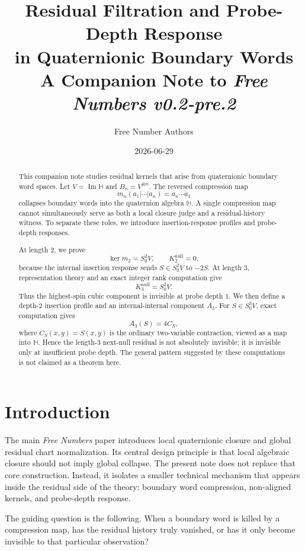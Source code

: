 \documentclass[11pt]{article}
\title{Residual Filtration and Probe-Depth Response\\
\large in Quaternionic Boundary Words\\[0.5em]
\normalsize A Companion Note to \emph{Free Numbers v0.2-pre.2}}
\author{Free Number Authors}
\date{2026-06-29}
\theoremstyle{definition}
\newcommand{\Ker}{\operatorname{ker}}
\begin{document}
\maketitle

\begin{abstract}
This companion note studies residual kernels that arise from quaternionic boundary word spaces.
Let $V=\operatorname{Im}\mathbb{H}$ and $B_n=V^{\otimes n}$.
The reversed compression map
\[
  m_n(a_1|\cdots|a_n)=a_n\cdots a_1
\]
collapses boundary words into the quaternion algebra $\mathbb{H}$.
A single compression map cannot simultaneously serve as both a local closure judge and a residual-history witness.
To separate these roles, we introduce insertion-response profiles and probe-depth responses.

At length $2$, we prove
\[
  \Ker m_2=S^2_0V,
  \qquad
  K_2^{\mathrm{null}}=0,
\]
because the internal insertion response sends $S\in S^2_0V$ to $-2S$.
At length $3$, representation theory and an exact integer rank computation give
\[
  K_3^{\mathrm{null}}=S^3_0V.
\]
Thus the highest-spin cubic component is invisible at probe depth $1$.
We then define a depth-$2$ insertion profile and an internal-internal component $A_3$.
For $S\in S^3_0V$, exact computation gives
\[
  A_3(S)=4C_S,
\]
where $C_S(x,y)=S(x,y)$ is the ordinary two-variable contraction, viewed as a map into $\mathbb{H}$.
Hence the length-$3$ next-null residual is not absolutely invisible; it is invisible only at insufficient probe depth.
The general pattern suggested by these computations is not claimed as a theorem here.
\end{abstract}

\tableofcontents

\section{Introduction}

The main \emph{Free Numbers} paper introduces local quaternionic closure and global residual chart normalization.
Its central design principle is that local algebraic closure should not imply global collapse.
The present note does not replace that core construction.
Instead, it isolates a smaller technical mechanism that appears inside the residual side of the theory: boundary word compression, non-aligned kernels, and probe-depth response.

The guiding question is the following.
When a boundary word is killed by a compression map, has the residual history truly vanished, or has it only become invisible to that particular observation?
\end{document}
